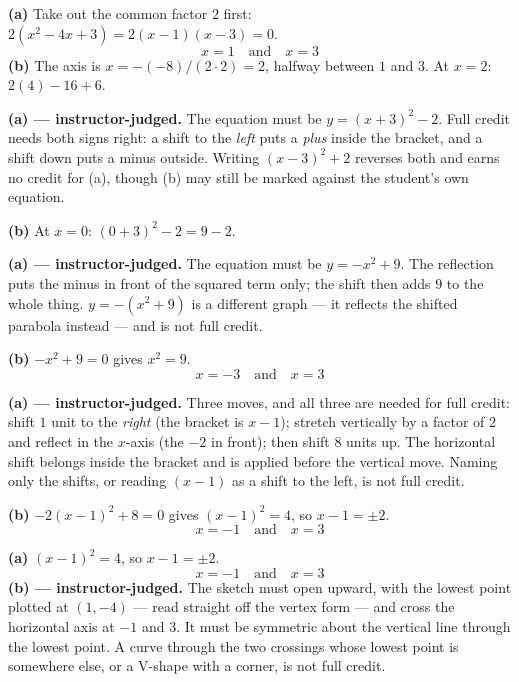 \documentclass[12pt]{article}
\begin{document}
\textbf{(a)} Take out the common factor $2$ first: $2(x^2 - 4x + 3) = 2(x-1)(x-3) = 0$.
\[ \boxed{x = 1 \quad \text{and} \quad x = 3} \]
\textbf{(b)} The axis is $x = -(-8)/(2 \cdot 2) = 2$, halfway between $1$ and $3$. At $x = 2$: $2(4) - 16 + 6$. 


\textbf{(a) --- instructor-judged.} The equation must be $y = (x+3)^2 - 2$. Full credit needs both signs right: a shift to the \emph{left} puts a \emph{plus} inside the bracket, and a shift down puts a minus outside. Writing $(x-3)^2 + 2$ reverses both and earns no credit for (a), though (b) may still be marked against the student's own equation.

\textbf{(b)} At $x = 0$: $(0+3)^2 - 2 = 9 - 2$. 


\textbf{(a) --- instructor-judged.} The equation must be $y = -x^2 + 9$. The reflection puts the minus in front of the squared term only; the shift then adds $9$ to the whole thing. $y = -(x^2 + 9)$ is a different graph --- it reflects the shifted parabola instead --- and is not full credit.

\textbf{(b)} $-x^2 + 9 = 0$ gives $x^2 = 9$.
\[ \boxed{x = -3 \quad \text{and} \quad x = 3} \]


\textbf{(a) --- instructor-judged.} Three moves, and all three are needed for full credit: shift $1$ unit to the \emph{right} (the bracket is $x - 1$); stretch vertically by a factor of $2$ and reflect in the $x$-axis (the $-2$ in front); then shift $8$ units up. The horizontal shift belongs inside the bracket and is applied before the vertical move. Naming only the shifts, or reading $(x-1)$ as a shift to the left, is not full credit.

\textbf{(b)} $-2(x-1)^2 + 8 = 0$ gives $(x-1)^2 = 4$, so $x - 1 = \pm 2$.
\[ \boxed{x = -1 \quad \text{and} \quad x = 3} \]


\textbf{(a)} $(x-1)^2 = 4$, so $x - 1 = \pm 2$.
\[ \boxed{x = -1 \quad \text{and} \quad x = 3} \]
\textbf{(b) --- instructor-judged.} The sketch must open upward, with the lowest point plotted at $(1, -4)$ --- read straight off the vertex form --- and cross the horizontal axis at $-1$ and $3$. It must be symmetric about the vertical line through the lowest point. A curve through the two crossings whose lowest point is somewhere else, or a V-shape with a corner, is not full credit.
\end{document}
